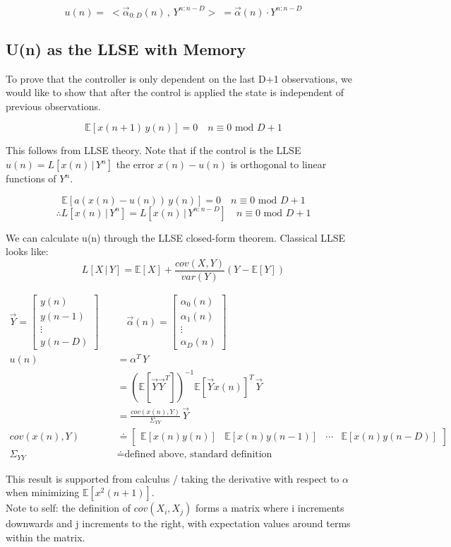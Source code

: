 \documentclass[14pt]{extarticle}
\begin{document}
\[ u(n) = \; < \vec{\alpha}_{0:D}(n) \, , \, Y^{n:n-D} > \; = \vec{\alpha}(n) \cdot Y^{n:n-D} \]

\subsection{U(n) as the LLSE with Memory}

To prove that the controller is only dependent on the last D+1 observations, we would like to show that after the control is applied the state is independent of previous observations.

\[ \mathbb{E}[x(n+1) \, y(n)] = 0 \quad n \equiv 0 \text{ mod } D+1 \]

This follows from LLSE theory. Note that if the control is the LLSE $u(n) = L[x(n) \, | \, Y^n]$ the error $x(n) - u(n)$ is orthogonal to linear functions of $Y^n$.

\[ \mathbb{E}[a(x(n) - u(n)) \, y(n) ] = 0 \quad n \equiv 0 \text{ mod } D+1 \]
\[ \therefore L[x(n) \, | \, Y^n] = L[x(n) \, | \, Y^{n:n-D}] \quad n \equiv 0 \text{ mod } D+1 \]

We can calculate u(n) through the LLSE closed-form theorem. Classical LLSE looks like:
\[ L[X \, | \, Y] = \mathbb{E}[X] + \frac{cov(X, Y)}{var(Y)} \left( Y - \mathbb{E}[Y] \right) \]

\begin{align*}
\vec{Y} = \begin{bmatrix}
y(n) \\ y(n-1) \\ \vdots \\ y(n-D)
\end{bmatrix} \quad & \quad \vec{\alpha}(n) = \begin{bmatrix}
\alpha_0(n) \\ \alpha_1(n) \\ \vdots \\ \alpha_D(n)
\end{bmatrix} \\
u(n) &= \alpha^T \, Y \\
&= \left( \mathbb{E}[ \vec{Y} \vec{Y}^T] \right)^{-1} \mathbb{E}[ \vec{Y} x(n) ]^T \, \vec{Y} \\
&= \frac{cov(x(n), Y)}{\Sigma_{YY}} \, \vec{Y} \\
cov(x(n), Y) & \doteq \begin{bmatrix}
\mathbb{E}[x(n)y(n)] & \mathbb{E}[x(n)y(n-1)] & \cdots & \mathbb{E}[x(n)y(n-D)]
\end{bmatrix} \\
\Sigma_{YY} & \doteq \text{defined above, standard definition}
\end{align*}

This result is supported from calculus / taking the derivative with respect to $\alpha$ when minimizing $\mathbb{E}[x^2(n+1)]$. \\

Note to self: the definition of $cov(X_i, X_j)$ forms a matrix where i increments downwards and j increments to the right, with expectation values around terms within the matrix.
\end{document}
